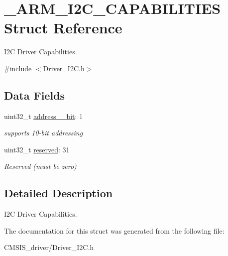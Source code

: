 \hypertarget{struct___a_r_m___i2_c___c_a_p_a_b_i_l_i_t_i_e_s}{}\section{\+\_\+\+A\+R\+M\+\_\+\+I2\+C\+\_\+\+C\+A\+P\+A\+B\+I\+L\+I\+T\+I\+ES Struct Reference}
\label{struct___a_r_m___i2_c___c_a_p_a_b_i_l_i_t_i_e_s}


I2C Driver Capabilities.  




{\ttfamily \#include $<$Driver\+\_\+\+I2\+C.\+h$>$}

\subsection*{Data Fields}
\begin{DoxyCompactItemize}
\item 
\mbox{\label{struct___a_r_m___i2_c___c_a_p_a_b_i_l_i_t_i_e_s_a4ffaaf168a9f43e98d710abff5861ed5}} 
uint32\+\_\+t \mbox{\hyperlink{struct___a_r_m___i2_c___c_a_p_a_b_i_l_i_t_i_e_s_a4ffaaf168a9f43e98d710abff5861ed5}{address\+\_\+\_\+bit}}\+: 1
\begin{DoxyCompactList}\small\item\em supports 10-\/bit addressing \end{DoxyCompactList}\item 
\mbox{\label{struct___a_r_m___i2_c___c_a_p_a_b_i_l_i_t_i_e_s_aa43c4c21b173ada1b6b7568956f0d650}} 
uint32\+\_\+t \mbox{\hyperlink{struct___a_r_m___i2_c___c_a_p_a_b_i_l_i_t_i_e_s_aa43c4c21b173ada1b6b7568956f0d650}{reserved}}\+: 31
\begin{DoxyCompactList}\small\item\em Reserved (must be zero) \end{DoxyCompactList}\end{DoxyCompactItemize}


\subsection{Detailed Description}
I2C Driver Capabilities. 

The documentation for this struct was generated from the following file\+:\begin{DoxyCompactItemize}
\item 
C\+M\+S\+I\+S\+\_\+driver/Driver\+\_\+\+I2\+C.\+h\end{DoxyCompactItemize}
